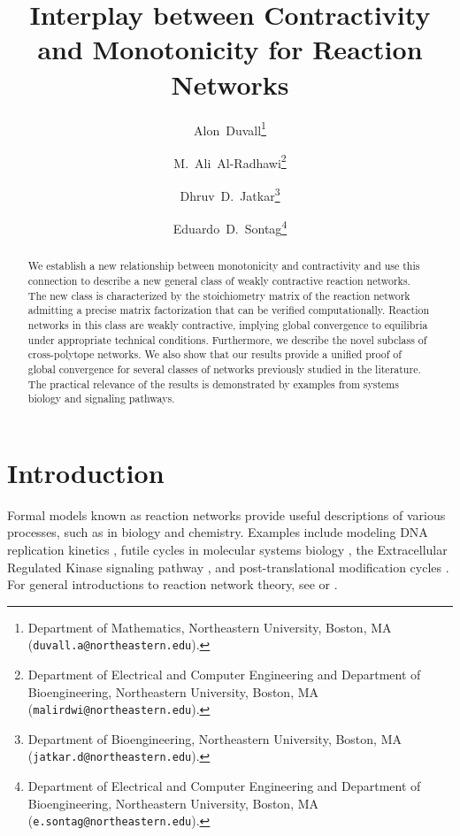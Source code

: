 \documentclass{article}
\begin{document}
\title{Interplay between Contractivity and Monotonicity for Reaction Networks
}


\author{Alon~Duvall\thanks{Department of Mathematics, Northeastern University, Boston, MA (\texttt{duvall.a@northeastern.edu}).}
\and M.~Ali~Al-Radhawi\thanks{Department of Electrical and Computer Engineering and Department of Bioengineering, Northeastern University, Boston, MA (\texttt{malirdwi@northeastern.edu}).}
\and Dhruv~D.~Jatkar\thanks{Department of Bioengineering, Northeastern University, Boston, MA (\texttt{jatkar.d@northeastern.edu}).}
\and Eduardo~D.~Sontag\thanks{Department of Electrical and Computer Engineering and Department of Bioengineering, Northeastern University, Boston, MA (\texttt{e.sontag@northeastern.edu}).}}



\maketitle

\begin{abstract}
 We establish a new relationship between monotonicity and contractivity and use this connection to describe a new general class of weakly contractive reaction networks. The new class is characterized by the stoichiometry matrix of the reaction network admitting a precise matrix factorization that can be verified computationally. Reaction networks in this class are weakly contractive, implying global convergence to equilibria under appropriate technical conditions. Furthermore, we describe the novel subclass of cross-polytope networks. We also show that our results provide a unified proof of global convergence for several classes of networks previously studied in the literature. The practical relevance of the results is demonstrated by examples from systems biology and signaling pathways. 
\end{abstract}


\section{Introduction}


Formal models known as reaction networks provide useful descriptions of various processes, such as in biology and chemistry. Examples include modeling DNA replication kinetics \cite{https://doi.org/10.1002/bit.20617}, futile cycles in molecular systems biology \cite{Angeli2010-hj}, the Extracellular Regulated Kinase signaling pathway \cite{10.1371/journal.pcbi.1007681}, and post-translational modification cycles \cite{cite-key}. For general introductions to reaction network theory, see \cite{erdi1989mathematical} or \cite{Feinberg}.
\end{document}
